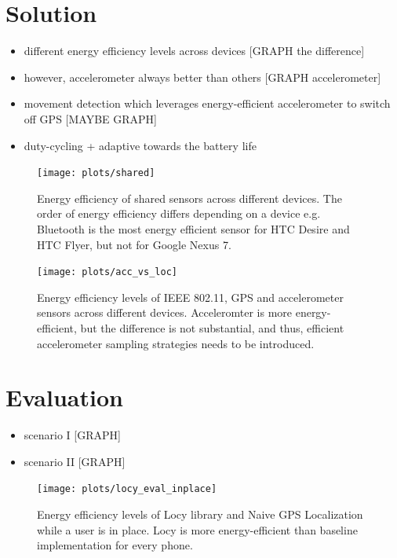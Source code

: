 \documentclass[a2,landscape]{a0poster}
\begin{document}
\section*{Solution}
\begin{itemize}
   \item different energy efficiency levels across devices [GRAPH the difference]
   \item however, accelerometer always better than others [GRAPH accelerometer]
   \item movement detection which leverages energy-efficient accelerometer to switch off GPS [MAYBE GRAPH]
   \item duty-cycling + adaptive towards the battery life
  \end{itemize}

\begin{figure}[H]
\texttt{[image: plots/shared]}
\caption{\label{p:shared} \footnotesize{Energy efficiency of shared sensors across different devices. The order of energy efficiency differs depending on a device e.g. Bluetooth is the most energy efficient sensor for HTC Desire and HTC Flyer, but not for Google Nexus 7.} }
\end{figure}

\begin{figure}[H]
\texttt{[image: plots/acc\_vs\_loc]}
\caption{\label{p:acc_vs_loc} \footnotesize{Energy efficiency levels of IEEE 802.11, GPS and accelerometer sensors across different devices. Acceleromter is more energy-efficient, but the difference is not substantial, and thus, efficient accelerometer sampling strategies needs to be introduced.} }
\end{figure}


\mbox{}\framebreak
\section*{Evaluation}
\begin{itemize}
   \item scenario I [GRAPH]
   \item scenario II [GRAPH]
  \end{itemize}
  
\begin{figure}[H]
\texttt{[image: plots/locy\_eval\_inplace]}
\caption{\label{p:locy_eval_place} \footnotesize{Energy efficiency levels of Locy library and Naive GPS Localization while a user is in place. Locy is more energy-efficient than baseline implementation for every phone.} }
\end{figure}
\end{document}

